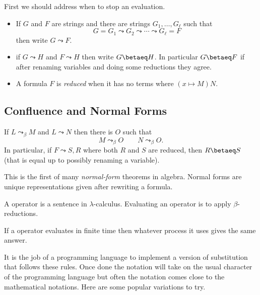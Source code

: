 First we should address when to stop an evaluation.
\begin{definition}
    \begin{itemize}
        \item If $G$ and $F$ are strings and there are strings 
        $G_1,\ldots,G_{\ell}$ such that 
        \[ G=G_1 \leadsto G_2 \leadsto\cdots\leadsto G_{\ell}=F\]
        then write $G\leadsto F$.

        \item if $G\leadsto H$ and $F\leadsto H$ then write $G\betaeq H$.
        In particular $G\betaeq F$ if after renaming variables and doing some reductions 
        they agree.

        \item A formula $F$ is \emph{reduced} when it has no terms where 
        $(x\mapsto M)N$.  
    
    \end{itemize}
    
\end{definition}

\subsection{Confluence and Normal Forms}
\begin{theorem}
    If $L\leadsto_{\beta} M$ and $L\leadsto N$ then there is $O$ such that 
    \[M\leadsto_{\beta} O\qquad N\leadsto_{\beta} O.\] 
    In particular, if $F\leadsto S,R$ where both $R$ and $S$ are reduced,
    then $R\betaeq S$ (that is equal up to possibly renaming a variable).
\end{theorem}

This is the first of many \emph{normal-form} theorems in algebra.
Normal forms are unique representations given after rewriting a formula.


\begin{definition}
    A operator is a sentence in $\lambda$-calculus.
    Evaluating an operator is to apply $\beta$-reductions.
\end{definition}

\begin{corollary}
    If a operator evaluates in finite time then whatever process it uses 
    gives the same answer.
\end{corollary}



It is the job of a programming language to implement a version 
of substitution that follows these rules.  Once done the notation will take 
on the usual character of the programming language but often the notation 
comes close to the mathematical notations.  Here are some popular variations to try.
\begin{center}
    \hspace{1cm}
    \hspace{1cm}
    \\
    \hspace{1cm}
\end{center} 


